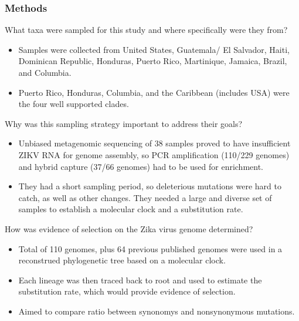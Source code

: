 \documentclass[12pt,a4paper]{article}
\begin{document}
\subsubsection{Methods}
\begin{itemize}
    {\color{G-Moon}\item What taxa were sampled for this study and where specifically were they from?}
        \begin{itemize}
            \item Samples were collected from United States, Guatemala/ El Salvador, Haiti, Dominican Republic, Honduras, Puerto Rico, Martinique, Jamaica, Brazil, and Columbia.
            \item Puerto Rico, Honduras, Columbia, and the Caribbean (includes USA) were the four well supported clades.
        \end{itemize}
    {\color{G-Moon}\item Why was this sampling strategy important to address their goals?}
        \begin{itemize}
            \item Unbiased metagenomic sequencing of 38 samples proved to have insufficient ZIKV RNA for genome assembly, so PCR amplification (110/229 genomes) and hybrid capture (37/66 genomes) had to be used for enrichment.
            \item They had a short sampling period, so deleterious mutations were hard to catch, as well as other changes. They needed a large and diverse set of samples to establish a molecular clock and a substitution rate.
        \end{itemize}
    {\color{G-Moon}\item How was evidence of selection on the Zika virus genome determined?}
        \begin{itemize}
            \item Total of 110 genomes, plus 64 previous published genomes were used in a reconstrued phylogenetic tree based on a molecular clock. 
            \item Each lineage was then traced back to root and used to estimate the substitution rate, which would provide evidence of selection.
            \item Aimed to compare ratio between synonomys and nonsynonymous mutations.
        \end{itemize}
\end{itemize}
\end{document}
